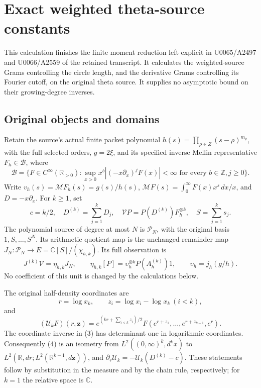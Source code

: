 \begingroup
\def\LCSB{\mathscr B}
\def\LCSV{\mathcal V}
\def\LCSM{\mathcal M}
\def\LCStr{\operatorname{Tr}}
\newtheorem{latecontroltheorem}{Theorem}[section]
\section{Exact weighted theta-source constants}
This calculation finishes the finite moment reduction left explicit in
U0065/A2497 and U0066/A2559 of the retained transcript. It calculates the
weighted-source Grams controlling the circle length, and the derivative
Grams controlling its Fourier cutoff, on the original theta source.
It supplies no asymptotic bound on their growing-degree inverses.

\subsection{Original objects and domains}
Retain the source's actual finite packet polynomial
\(h(s)=\prod_{\rho\in Z}(s-\rho)^{m_\rho}\), with the full selected
orders, \(g=2\xi\), and its specified inverse Mellin representative
\(F_h\in\LCSB\), where
\[
 \LCSB=\{F\in C^\infty(\mathbb R_{>0}):
 \sup_{x>0}x^b|(-x\partial_x)^jF(x)|<\infty
 \text{ for every }b\in\mathbb Z,j\ge0\}.
\]
Write \(v_h(s)=\LCSM F_h(s)=g(s)/h(s)\),
\(\LCSM F(s)=\int_0^\infty F(x)x^s\,dx/x\), and
\(D=-x\partial_x\). For \(k\ge1\), set
\[
 c=k/2,\quad D^{(k)}=\sum_{j=1}^kD_j,\quad
 \LCSV P=P(D^{(k)})F_h^{\otimes k},\quad S=\sum_{j=1}^ks_j.
 \tag{1}
\]
The polynomial source of degree at most \(N\) is \(\mathcal P_N\),
with the original basis \(1,S,\ldots,S^N\). Its arithmetic quotient
map is the unchanged remainder map
\(J_N:\mathcal P_N\to E=\mathbb C[S]/(\chi_{h,k})\).
Its full observation is
\[
 J^{(k)}\LCSV=\eta_{h,k}J_N,\qquad
 \eta_{h,k}[P]=\upsilon_h^{\otimes k}P(A_h^{(k)})1,\qquad
 \upsilon_h=j_h(g/h).
 \tag{2}
\]
No coefficient of this unit is changed by the calculations below.

The original half-density coordinates are
\[
 r=\log x_k,\qquad z_i=\log x_i-\log x_k\ (i<k),
 \tag{3}
\]
and
\[
 (\mathcal U_kF)(r,\mathbf z)
 =e^{(kr+\sum_{i<k}z_i)/2}
 F(e^{r+z_1},\ldots,e^{r+z_{k-1}},e^r).
 \tag{4}
\]
The coordinate inverse in (3) has determinant one in logarithmic
coordinates. Consequently (4) is an isometry from
\(L^2((0,\infty)^k,d^kx)\) to
\(L^2(\mathbb R,dr;L^2(\mathbb R^{k-1},d\mathbf z))\), and
\(\partial_r\mathcal U_k=-\mathcal U_k(D^{(k)}-c)\).
These statements follow by substitution in the measure and by the chain
rule, respectively; for \(k=1\) the relative space is \(\mathbb C\).


